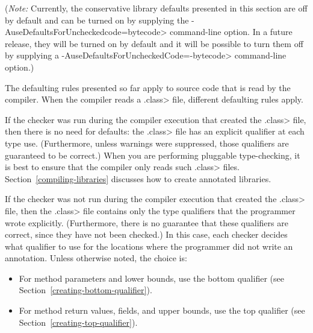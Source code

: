 
(\emph{Note:} Currently, the conservative library defaults presented in this section
are off by default and can be turned on by supplying the \<-AuseDefaultsForUncheckedcode=bytecode>
command-line option.  In a future release, they will be turned on
by default and it will be possible to turn them off by supplying a
\<-AuseDefaultsForUncheckedCode=-bytecode> command-line option.)

The defaulting rules presented so far apply to source code that is read by
the compiler.  When the compiler reads a \<.class> file, different
defaulting rules apply.

If the checker was run during the compiler execution that created the
\<.class> file,
then there is no need for
defaults:  the \<.class> file has an explicit qualifier at each type use.
(Furthermore, unless warnings were suppressed, those qualifiers are
guaranteed to be correct.)
When you are performing pluggable type-checking,
it is best to ensure that the compiler only reads such \<.class> files.
Section~\ref{compiling-libraries} discusses how to create annotated
libraries.

If the checker was not run during the compiler execution that created the
\<.class> file, then the \<.class> file contains only the type qualifiers
that the programmer wrote explicitly.  (Furthermore, there is no guarantee
that these qualifiers are correct, since they have not been checked.)
In this case, each checker decides what qualifier to use for the
locations where the programmer did not write an annotation.  Unless otherwise noted, the
choice is:

\begin{itemize}
\item
  For method parameters and lower bounds, use the bottom qualifier (see
  Section~\ref{creating-bottom-qualifier}).
\item
  For method return values, fields, and upper bounds, use the top qualifier (see
  Section~\ref{creating-top-qualifier}).
\end{itemize}

